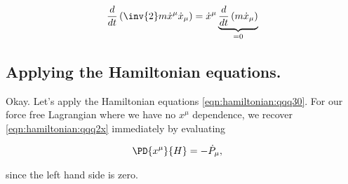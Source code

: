 \begin{align*}
\frac{d}{dt} \left( \inv{2} m \dot{x}^\mu \dot{x}_\mu \right) 
=
\dot{x}^\mu \underbrace{\frac{d}{dt} \left( m \dot{x}_\mu \right)}_{=0} \\
\end{align*}

\subsection{Applying the Hamiltonian equations.}

Okay.  Let's apply the Hamiltonian equations \ref{eqn:hamiltonian:qqq30}.  For our force free Lagrangian where we have no $x^\mu$ dependence, we recover \ref{eqn:hamiltonian:qqq2x} immediately by evaluating

\begin{align}\label{eqn:hamiltonian:qqq30b}
\PD{x^\mu}{H} &= -\dot{P}_\mu,
\end{align}

since the left hand side is zero.

\EndArticle

